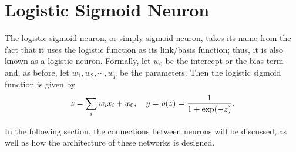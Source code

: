 \section{Logistic Sigmoid Neuron}\label{sec:sln}
The logistic sigmoid neuron, or simply sigmoid neuron, takes its name from the fact that it uses the logistic function as its link/basis function; thus, it is also known as a logistic neuron. Formally, let $w_0$ be the intercept or the bias term and, as before, let $w_1,w_2,\cdots,w_p$ be the parameters. Then the logistic sigmoid function is given by
\begin{equation}\label{eq:logsig}
z=\sum_{i}w_ix_i+w_0,\quad y=\varrho(z)=\frac{1}{1+\exp(-z)}.
\end{equation}

In the following section, the connections between neurons will be discussed, as well as how the architecture of these networks is designed.

